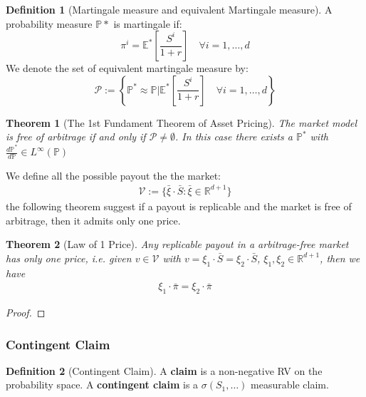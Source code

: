 \documentclass[a4paper,11pt]{book}
\newtheorem{theorem}{Theorem}[section]
\theoremstyle{definition}
\newtheorem{definition}{Definition}[section]
\theoremstyle{remark}
\begin{document}
\begin{definition}[Martingale measure and equivalent Martingale measure]
A probability measure $\mathbb{P}*$ is martingale if:
\begin{equation*}
	\pi^i = \mathbb{E}^*\left[\frac{S^i}{1 + r}\right] \quad \forall i = 1, \dots, d
\end{equation*}
We denote the set of equivalent martingale measure by:
\begin{equation*}
	\mathcal{P}:= \left\{\mathbb{P}^* \approx \mathbb{P}| \mathbb{E}^*\left[\frac{S^i}{1 + r}\right] \quad \forall i = 1, \dots, d \right\}
\end{equation*}
\end{definition}

\begin{theorem}[The 1st Fundament Theorem of Asset Pricing]
	The market model is free of arbitrage if and only if $\mathcal{P} \neq \emptyset$. In this case there exists a $\mathbb{P}^*$ with $\frac{d\mathbb{P}^*}{d\mathbb{P}} \in L^\infty(\mathbb{P})$
\end{theorem}

We define all the possible payout the the market:
\begin{align*}
	\mathcal{V}:= \{ \bar{\xi}\cdot \bar{S}: \bar{\xi} \in \mathbb{R}^{d +1}\}
\end{align*}
the following theorem suggest if a payout is replicable and the market is free of arbitrage, then it admits only one price.

\begin{theorem}[Law of 1 Price]
	Any replicable payout in a arbitrage-free market has only one price, i.e. given $v \in \mathcal{V}$ with $v = \xi_1 \cdot \bar{S} = \xi_2 \cdot \bar{S}$, $\xi_1, \xi_2 \in \mathbb{R}^{d +1}$, then we have
	\begin{align*}
		\xi_1 \cdot \bar{\pi}  = \xi_2  \cdot \bar{\pi}
	\end{align*}
\end{theorem}
\begin{proof}
	
\end{proof}


\subsubsection{Contingent Claim}
\begin{definition}[Contingent Claim]
A \textbf{claim} is a non-negative RV on the probability space. A \textbf{contingent claim} is a $\sigma(S_1, \dots)$ measurable claim.
\end{definition}
\end{document}
